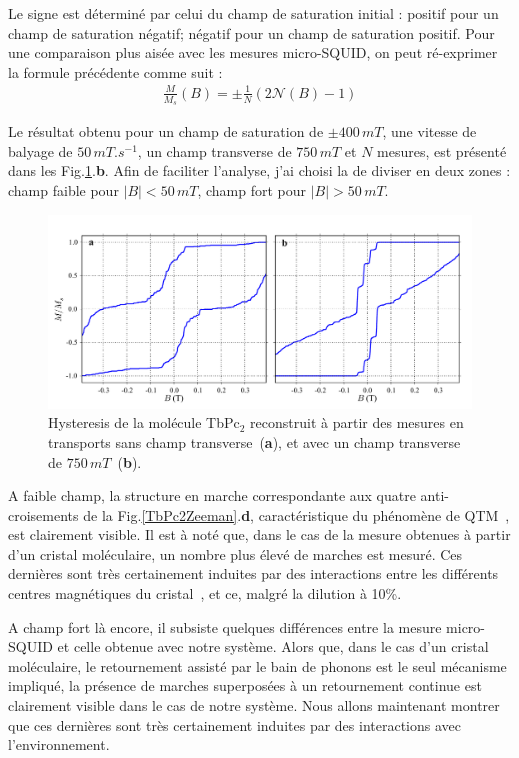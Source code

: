 Le signe est déterminé par celui du champ de saturation initial : positif pour un champ de saturation négatif; négatif pour un champ de saturation positif. Pour une comparaison plus aisée avec les mesures micro-SQUID, on peut ré-exprimer la formule précédente comme suit :
\begin{eqnarray}
\frac{M}{M_s}(B) =\pm \frac{1}{N} (2\mathscr{N}(B) -1)
\end{eqnarray}


Le résultat obtenu pour un champ de saturation de $\pm 400 \, mT$, une vitesse de balyage de $50\,mT.s^{-1}$, un champ transverse de $750\,mT$ et $N$ mesures, est présenté dans les Fig.\ref{CompAimant}.\textbf{b}. Afin de faciliter l'analyse, j'ai choisi la de diviser en deux zones : champ faible pour $|B|< 50\,mT$, champ fort pour $|B|>50\,mT$.

\begin{figure}
\includegraphics[scale=0.45]{Resultats/CompCrisMolUnique/CompCrisMolUnique.pdf} 
\caption{Hysteresis de la molécule TbPc$_2$ reconstruit à partir des mesures en transports sans champ transverse~(\textbf{a}), et avec un champ transverse de $750\,mT$~(\textbf{b}).}
\label{CompAimant}
\end{figure}

A faible champ, la structure en marche correspondante aux quatre anti-croisements de la Fig.\ref{TbPc2Zeeman}.\textbf{d}, caractéristique du phénomène de QTM~\cite{Thomas1996,Friedman1996}, est clairement visible. Il est à noté que, dans le cas de la mesure obtenues à partir d'un cristal moléculaire, un nombre plus élevé de marches est mesuré. Ces dernières sont très certainement induites par des interactions entre les différents centres magnétiques du cristal~\cite{Wernsdorfer2002}, et ce, malgré la dilution à 10\%.

A champ fort là encore, il subsiste quelques différences entre la mesure micro-SQUID et celle obtenue avec notre système. Alors que, dans le cas d'un cristal moléculaire, le retournement assisté par le bain de phonons est le seul mécanisme impliqué, la présence  de marches superposées à un retournement continue est clairement visible dans le cas de notre système. Nous allons maintenant montrer que ces dernières sont très certainement induites par des interactions avec l'environnement.


